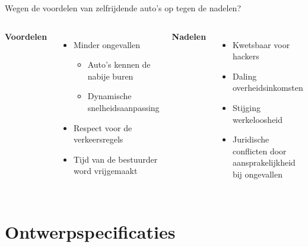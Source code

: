 \documentclass[aspectratio=169,kulak,t,handout]{kulakbeamer} %
\begin{document}
\begin{frame}{{\Large Wegen de voordelen van zelfrijdende auto's op tegen de nadelen?}}
	\begin{columns}
	\centering
	{\bf{Voordelen}}\\[.2cm]

		\begin{itemize}
			\large\item Minder ongevallen
			\begin{itemize}
				\normalsize\item Auto's kennen de nabije buren
				\item Dynamische snelheidsaanpassing
			\end{itemize}
			\item Respect voor de verkeersregels
			\item Tijd van de bestuurder word vrijgemaakt
			
		\end{itemize}
	\centering
	{\bf{Nadelen}}\\[.2cm]

			\begin{itemize}
			\large\item Kwetsbaar voor hackers
			\item Daling overheidsinkomsten
			\item Stijging werkeloosheid
			\item Juridische conflicten door aansprakelijkheid bij ongevallen
			\end{itemize}
	
	\end{columns}
\end{frame}

\begin{outlineframe}[Overzicht]
	\tableofcontents
\end{outlineframe}


\section{Ontwerpspecificaties}
\end{document}
